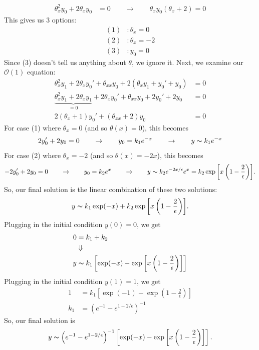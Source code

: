 \documentclass[10pt,letterpaper]{report}
\newcommand{\so}{\qquad \rightarrow \qquad}
\newcommand{\Ord}[1]{\mathcal{O}\left({#1}\right)}
\begin{document}
\begin{enumerate}
\begin{align*}
    \theta_x^2 y_0 + 2\theta_xy_0 &= 0 \so \theta_x y_0\left(\theta_x + 2\right) = 0
\end{align*}
This gives us 3 options:
\begin{align*}
    (1) &: \theta_x = 0 \\
    (2) &: \theta_x = -2 \\
    (3) &: y_0 = 0
\end{align*}
Since (3) doesn't tell us anything about $\theta$, we ignore it. Next, we examine our $\Ord{1}$ equation:
\begin{align*}
    \theta_x^2 y_1 + 2\theta_x y_0' + \theta_{xx}y_0 + 2\left(\theta_x y_1 + y_0' + y_0\right) &= 0
    \\
    \underbrace{\theta_x^2 y_1  + 2\theta_x y_1}_{=0} + 2\theta_x y_0' + \theta_{xx}y_0 + 2y_0' + 2y_0 &= 0
    \\
    2\left(\theta_x + 1\right) y_0' + \left(\theta_{xx} + 2\right)y_0 &= 0
\end{align*}
For case (1) where $\theta_x = 0$ (and so $\theta(x) = 0$), this becomes
\begin{align*}
    2y_0' + 2y_0 = 0 \so y_0 = k_1 e^{-x} \so y \thicksim k_1e^{-x}
\end{align*}
For case (2) where $\theta_x = -2$ (and so $\theta(x) = -2x$), this becomes
\begin{align*}
    -2y_0' + 2y_0 = 0 \so y_0 = k_2 e^{x} \so y \thicksim k_2e^{-2x/\epsilon}e^{x} = k_2 \exp{\left[x\left(1 - \frac{2}{\epsilon}\right)\right]}.
\end{align*}
So, our final solution is the linear combination of these two solutions:
\[
y \thicksim k_1\exp(-x) + k_2 \exp{\left[x\left(1 - \frac{2}{\epsilon}\right)\right]}.
\]
Plugging in the initial condition $y(0) = 0$, we get
\begin{align*}
    0 &= k_1 + k_2 \\
    &\Downarrow \\
    y &\thicksim k_1\left[\exp(-x) - \exp{\left[x\left(1 - \frac{2}{\epsilon}\right)\right]}\right]
\end{align*}
Plugging in the initial condition $y(1)=1$, we get 
\begin{align*}
    1 &= k_1\left[\exp(-1) - \exp{\left(1 - \frac{2}{\epsilon}\right)}\right] \\
    k_1 &= \left(e^{-1} - e^{1 - 2/\epsilon}\right)^{-1}
\end{align*}
So, our final solution is
\[
y \thicksim \left(e^{-1} - e^{1 - 2/\epsilon}\right)^{-1}\left[\exp(-x) - \exp{\left[x\left(1 - \frac{2}{\epsilon}\right)\right]}\right].
\]


\end{enumerate}
\end{document}
